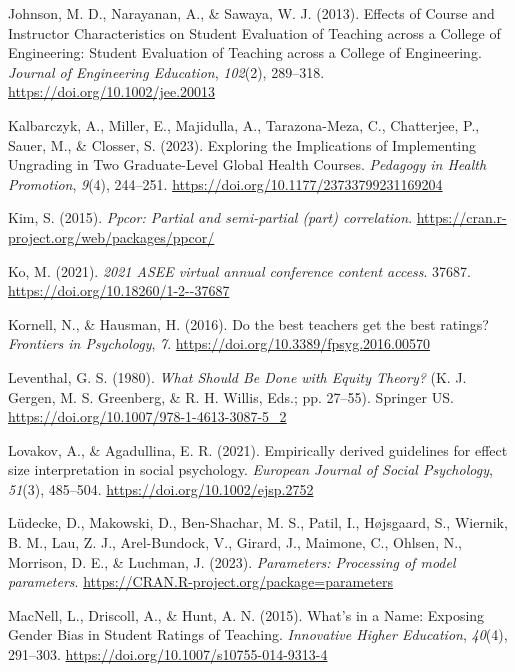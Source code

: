 \documentclass[
  man,mask]{apa7}
\newlength{\cslhangindent}
\newenvironment{CSLReferences}[2] %
 {\begin{list}{}{%
  \setlength{\itemindent}{0pt}
  \setlength{\leftmargin}{0pt}
  \setlength{\parsep}{0pt}
  \ifodd #1
   \setlength{\leftmargin}{\cslhangindent}
   \setlength{\itemindent}{-1\cslhangindent}
  \fi
  \setlength{\itemsep}{#2\baselineskip}}}
 {\end{list}}
\begin{document}
\begin{CSLReferences}{1}{0}
Johnson, M. D., Narayanan, A., \& Sawaya, W. J. (2013). Effects of Course and Instructor Characteristics on Student Evaluation of Teaching across a College of Engineering: Student Evaluation of Teaching across a College of Engineering. \emph{Journal of Engineering Education}, \emph{102}(2), 289--318. \url{https://doi.org/10.1002/jee.20013}

Kalbarczyk, A., Miller, E., Majidulla, A., Tarazona-Meza, C., Chatterjee, P., Sauer, M., \& Closser, S. (2023). Exploring the Implications of Implementing Ungrading in Two Graduate-Level Global Health Courses. \emph{Pedagogy in Health Promotion}, \emph{9}(4), 244--251. \url{https://doi.org/10.1177/23733799231169204}

Kim, S. (2015). \emph{Ppcor: Partial and semi-partial (part) correlation}. \url{https://cran.r-project.org/web/packages/ppcor/}

Ko, M. (2021). \emph{2021 ASEE virtual annual conference content access}. 37687. \url{https://doi.org/10.18260/1-2--37687}

Kornell, N., \& Hausman, H. (2016). Do the best teachers get the best ratings? \emph{Frontiers in Psychology}, \emph{7}. \url{https://doi.org/10.3389/fpsyg.2016.00570}

Leventhal, G. S. (1980). \emph{What Should Be Done with Equity Theory?} (K. J. Gergen, M. S. Greenberg, \& R. H. Willis, Eds.; pp. 27--55). Springer US. \url{https://doi.org/10.1007/978-1-4613-3087-5_2}

Lovakov, A., \& Agadullina, E. R. (2021). Empirically derived guidelines for effect size interpretation in social psychology. \emph{European Journal of Social Psychology}, \emph{51}(3), 485--504. \url{https://doi.org/10.1002/ejsp.2752}

Lüdecke, D., Makowski, D., Ben-Shachar, M. S., Patil, I., Højsgaard, S., Wiernik, B. M., Lau, Z. J., Arel-Bundock, V., Girard, J., Maimone, C., Ohlsen, N., Morrison, D. E., \& Luchman, J. (2023). \emph{Parameters: Processing of model parameters}. \url{https://CRAN.R-project.org/package=parameters}

MacNell, L., Driscoll, A., \& Hunt, A. N. (2015). What{'}s in a Name: Exposing Gender Bias in Student Ratings of Teaching. \emph{Innovative Higher Education}, \emph{40}(4), 291--303. \url{https://doi.org/10.1007/s10755-014-9313-4}


\end{CSLReferences}
\end{document}
